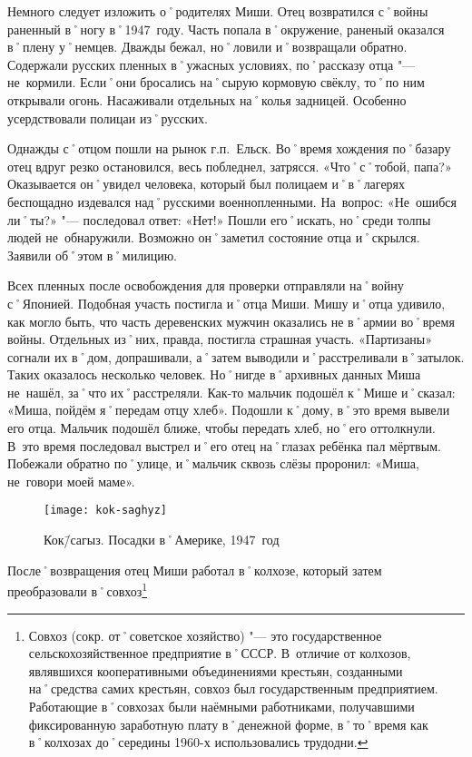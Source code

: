 Немного следует изложить о˚родителях Миши. Отец возвратился с˚войны раненный в˚ногу в˚1947~году. Часть попала в˚окружение, раненый оказался в˚плену у˚немцев. Дважды бежал, но˚ловили и˚возвращали обратно. Содержали русских пленных в˚ужасных условиях, по˚рассказу отца "--- не~кормили. Если˚они бросались на˚сырую кормовую свёклу, то˚по ним открывали огонь. Насаживали отдельных на˚колья задницей. Особенно усердствовали полицаи из˚русских. 

Однажды с˚отцом пошли на рынок г.п.~Ельск. Во˚время хождения по˚базару отец вдруг резко остановился, весь побледнел, затрясся. «Что˚с˚тобой, папа?» Оказывается он˚увидел человека, который был полицаем и˚в˚лагерях беспощадно издевался над˚русскими военнопленными. На~вопрос: «Не~ошибся ли˚ты?» "--- последовал ответ: «Нет!» Пошли его˚искать, но˚среди толпы людей не~обнаружили. Возможно он˚заметил состояние отца и˚скрылся. Заявили об˚этом в˚милицию.

Всех пленных после освобождения для проверки отправляли на˚войну с˚Японией. Подобная участь постигла и˚отца Миши. Мишу и˚отца удивило, как могло быть, что часть деревенских мужчин оказались не в˚армии во˚время войны. Отдельных из˚них, правда, постигла страшная участь. «Партизаны» согнали их в˚дом, допрашивали, а˚затем выводили и˚расстреливали в˚затылок. Таких оказалось несколько человек. Но˚нигде в˚архивных данных Миша не~нашёл, за˚что их˚расстреляли. Как-то мальчик подошёл к˚Мише и˚сказал: «Миша, пойдём я˚передам отцу хлеб». Подошли к˚дому, в˚это время вывели его отца. Мальчик подошёл ближе, чтобы передать хлеб, но˚его оттолкнули. В~это время последовал выстрел и˚его отец на˚глазах ребёнка пал мёртвым. Побежали обратно по˚улице, и˚мальчик сквозь слёзы проронил: «Миша, не~говори моей маме». 

\begin{wrapfigure}{O}{.4\textwidth}
\centering
\texttt{[image: kok-saghyz]}
\caption[Кок\=/сагыз. Посадки в˚Америке, 1947~год]{Кок\=/сагыз. Посадки в˚Америке, 1947~год\footnotemark}
\label{fig:kok-saghyz}
\end{wrapfigure}

После˚возвращения отец Миши работал в˚колхозе, который затем преобразовали в˚совхоз\footnote{Совхоз (сокр. от˚советское хозяйство) "--- это государственное сельскохозяйственное предприятие в˚СССР. В~отличие от колхозов, являвшихся кооперативными объединениями крестьян, созданными на˚средства самих крестьян, совхоз был государственным предприятием. Работающие в˚совхозах были наёмными работниками, получавшими фиксированную заработную плату в˚денежной форме, в˚то˚время как в˚колхозах до˚середины 1960-х использовались трудодни.}

